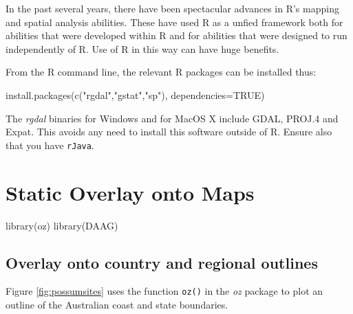 \documentclass{tufte-book}\usepackage[]{graphicx}\usepackage[]{color}
\newcommand{\txtt}[1]{\texttt{#1}}
\begin{document}



In the past several years, there have been spectacular advances in R's
mapping and spatial analysis abilities. These have used R as a unfied
framework both for abilities that were developed within R and for
abilities that were designed to run independently of R.  Use of R in
this way can have huge benefits.

From the R command line, the relevant R packages can be installed thus:
\begin{Schunk}
\begin{Sinput}
install.packages(c("rgdal","gstat","sp"),
                 dependencies=TRUE)
\end{Sinput}
\end{Schunk}

The {\em rgdal} binaries for Windows and for MacOS X include GDAL,
PROJ.4 and Expat. This avoids any need to install this software
outside of R. Ensure also that you have \txtt{rJava}.

\section{Static Overlay onto Maps}

\begin{Schunk}
\begin{Sinput}
library(oz)
library(DAAG)
\end{Sinput}
\end{Schunk}

\subsection{Overlay onto country and regional outlines}

Figure \ref{fig:possumsites} uses the function \txtt{oz()} in the
\textit{oz} package to plot an outline of the Australian coast and
state boundaries.
\end{document}
